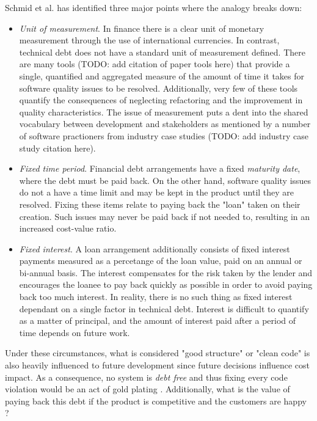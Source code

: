 \documentclass{mprop}
\begin{document}
Schmid et al. \cite{Schmid2013} has identified three major points where the
analogy breaks down:
\begin{itemize}
	\item \textit{Unit of measurement}. In finance there is a clear unit of
	      monetary measurement through the use of international currencies. In
	      contrast, technical debt does not have a standard unit of measurement
	      defined. There are many tools (TODO: add citation of paper tools here)
	      that provide a single, quantified and aggregated measure of the amount
	      of time it takes for software quality issues to be resolved.
	      Additionally, very few of these tools quantify the consequences of
	      neglecting refactoring and the improvement in quality characteristics.
	      The issue of measurement puts a dent into the shared vocabulary
	      between development and stakeholders as mentioned by a number of
	      software practioners from industry case studies (TODO: add industry
	      case study citation here).
	\item \textit{Fixed time period}. Financial debt arrangements have a fixed
	      \textit{maturity date}, where the debt must be paid back. On the other
	      hand, software quality issues do not a have a time limit and may be
	      kept in the product until they are resolved. Fixing these items relate
	      to paying back the "loan" taken on their creation. Such issues may
	      never be paid back if not needed to, resulting in an increased
	      cost-value ratio.
	\item \textit{Fixed interest}. A loan arrangement additionally consists of
	      fixed interest payments measured as a percetange of the loan value,
	      paid on an annual or bi-annual basis. The interest compensates for
	      the risk taken by the lender and encourages the loanee to pay back
	      quickly as possible in order to avoid paying back too much interest.
	      In reality, there is no such thing as fixed interest dependant on a
	      single factor in technical debt. Interest is difficult to quantify
	      as a matter of principal, and the amount of interest paid after a
	      period of time depends on future work.
\end{itemize}
Under these circumstances, what is considered "good structure" or "clean code"
is also heavily influenced to future development since future decisions
influence cost impact. As a consequence, no system is \textit{debt free} and
thus fixing every code violation would be an act of gold plating
\cite{Kruchten2012}. Additionally, what is the value of paying back this debt if
the product is competitive and the customers are happy \cite{Lim2012}?
\end{document}
